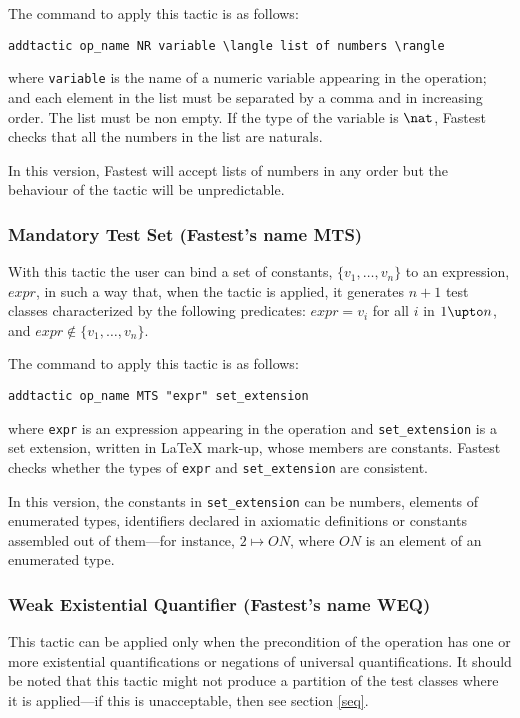 The command to apply this tactic is as follows:

\begin{verbatim}
addtactic op_name NR variable \langle list of numbers \rangle
\end{verbatim}

\noindent where \verb+variable+ is the name of a numeric variable appearing in the operation; and each element in the list must be separated by a comma and in increasing order. The list must be non empty. If the type of the variable is $\nat$, Fastest checks that all the numbers in the list are naturals. 

\vspace{5mm} In this version, Fastest will accept lists of numbers in any order but the behaviour of the tactic will be unpredictable.\vspace{5mm}

\subsubsection{\label{mts}Mandatory Test Set (Fastest's name MTS)}
With this tactic the user can bind a set of constants, $\{v_{1}, \dots, v_{n}\}$ to an expression, $expr$, in such a way that, when the tactic is applied, it generates $n + 1$ test classes characterized by the following predicates: $expr = v_{i}$ for all $i$ in $1 \upto n$, and  $expr \notin \{v_{1}, \dots, v_{n}\}$.

The command to apply this tactic is as follows:

\begin{verbatim}
addtactic op_name MTS "expr" set_extension
\end{verbatim}

\noindent where \verb+expr+ is an expression appearing in the operation and \verb+set_extension+ is a set extension, written in \LaTeX{} mark-up, whose members are constants. Fastest checks whether the types of \verb+expr+ and \verb+set_extension+ are consistent.

In this version, the constants in \verb+set_extension+ can be numbers, elements of enumerated types, identifiers declared in axiomatic definitions or constants assembled out of them---for instance, $2 \mapsto ON$, where $ON$ is an element of an enumerated type. 


\subsubsection{\label{weq}Weak Existential Quantifier (Fastest's name WEQ)}
This tactic can be applied only when the precondition of the operation has one or more existential quantifications or negations of universal quantifications. It should be noted that this tactic might not produce a partition of the test classes where it is applied---if this is unacceptable, then see section \ref{seq}. 

